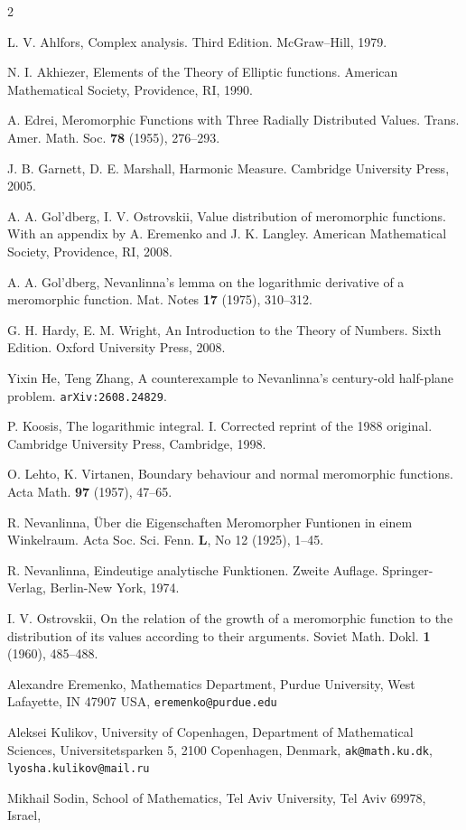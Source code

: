 \documentclass[12pt]{paper}
\begin{document}
\begin{thebibliography}{2}

 L. V. Ahlfors, Complex analysis. Third Edition. McGraw--Hill, 1979.

 N. I. Akhiezer, Elements of the Theory of Elliptic functions.
American Mathematical Society, Providence, RI, 1990.

 A. Edrei,
Meromorphic Functions with Three Radially Distributed Values.
Trans. Amer. Math. Soc. {\bf 78} (1955), 276--293.

 J. B. Garnett, D. E. Marshall, Harmonic Measure. 
Cambridge University Press, 2005.

 A. A. Gol'dberg, I. V. Ostrovskii,
Value distribution of meromorphic functions. With an appendix by A. Eremenko and J. K. Langley. 
American Mathematical Society, Providence, RI, 2008. 

 A. A. Gol'dberg,
Nevanlinna's lemma on the logarithmic derivative of a meromorphic function. Mat. Notes {\bf 17} (1975), 
310--312.

  G. H. Hardy, E. M. Wright,
An Introduction to the Theory of Numbers. Sixth Edition.
Oxford University Press, 2008.


 Yixin He, Teng Zhang,
A counterexample to Nevanlinna's century-old half-plane problem.
{\tt arXiv:2608.24829}.

 P. Koosis,
The logarithmic integral. I. 
Corrected reprint of the 1988 original.
Cambridge University Press, Cambridge, 1998.

 O. Lehto, K. Virtanen,
Boundary behaviour and normal meromorphic functions.
Acta Math. {\bf 97} (1957), 47--65.


 R. Nevanlinna,
\"Uber die Eigenschaften Meromorpher Funtionen in einem Winkelraum.
Acta Soc. Sci. Fenn. {\bf L}, No 12 (1925), 1--45.

 R. Nevanlinna,
Eindeutige analytische Funktionen. 
Zweite Auflage. Springer-Verlag, Berlin-New York, 1974. 

 I. V. Ostrovskii,
On the relation of the growth of a meromorphic function to the distribution of its values according to their arguments. Soviet Math. Dokl. {\bf 1} (1960), 485--488.


\end{thebibliography}

\bigskip
\medskip

\noindent Alexandre Eremenko,
Mathematics Department, Purdue University, West Lafayette, IN 47907 USA, 
{\tt eremenko@purdue.edu}

\medskip\noindent Aleksei Kulikov,
University of Copenhagen, Department of Mathematical Sciences, Universitetsparken 5, 2100 Copenhagen, Denmark,
{\tt  ak@math.ku.dk}, {\tt lyosha.kulikov@mail.ru}

\medskip\noindent Mikhail Sodin,
School of Mathematics, Tel Aviv University, Tel Aviv 69978, Israel,
\end{document}
